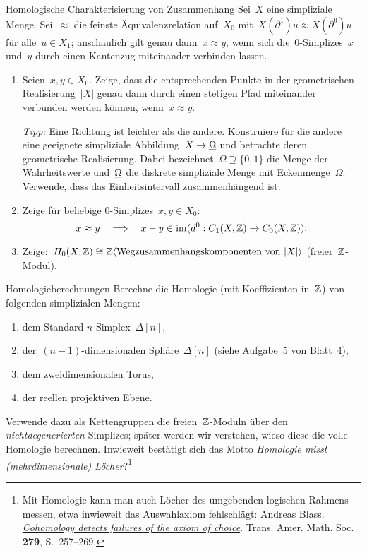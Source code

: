 \documentclass{uebblatt}
\begin{document}

\begin{aufgabe}{Homologische Charakterisierung von Zusammenhang}
Sei~$X$ eine simpliziale Menge. Sei~$\approx$ die feinste Äquivalenzrelation
auf~$X_0$ mit~$X(\partial^1)u \approx X(\partial^0)u$ für alle~$u \in X_1$;
anschaulich gilt genau dann~$x \approx y$, wenn sich die~0-Simplizes~$x$
und~$y$ durch einen Kantenzug miteinander verbinden lassen.
\begin{enumerate}
\item Seien~$x,y \in X_0$. Zeige, dass die entsprechenden Punkte in der
geometrischen Realisierung~$|X|$ genau dann durch einen stetigen Pfad
miteinander verbunden werden können, wenn~$x \approx y$.

{\tiny
\emph{Tipp:} Eine Richtung ist leichter als die andere. Konstruiere für die
andere eine geeignete simpliziale Abbildung~$X \to \underline{\Omega}$ und betrachte
deren geometrische Realisierung. Dabei bezeichnet~$\Omega \supseteq \{0,1\}$ die
Menge der Wahrheitswerte und~$\underline{\Omega}$ die diskrete simpliziale Menge mit
Eckenmenge~$\Omega$. Verwende, dass das Einheitsintervall zusammenhängend ist.\par}

\item Zeige für beliebige 0-Simplizes~$x,y \in X_0$:
\[ x \approx y
  \quad\Longrightarrow\quad
  x - y \in \operatorname{im}(d^0 : C_1(X,\mathbb{Z}) \to C_0(X,\mathbb{Z})). \]

\item Zeige:~$H_0(X,\mathbb{Z}) \cong \mathbb{Z}\langle \text{Wegzusammenhangskomponenten
von~$|X|$} \rangle$ (freier~$\mathbb{Z}$-Modul).
\end{enumerate}
\end{aufgabe}

\begin{aufgabe}{Homologieberechnungen}
Berechne die Homologie (mit Koeffizienten in~$\mathbb{Z}$) von folgenden simplizialen
Mengen:
\begin{enumerate}
\item dem Standard-$n$-Simplex~$\Delta[n]$,
\item der~$(n-1)$-dimensionalen Sphäre~$\dot\Delta[n]$ (siehe Aufgabe~5 von Blatt~4),
\item dem zweidimensionalen Torus,
\item der reellen projektiven Ebene.
\end{enumerate}
Verwende dazu als Kettengruppen die freien~$\mathbb{Z}$-Moduln über den
\emph{nichtdegenerierten} Simplizes; später werden wir verstehen, wieso diese
die volle Homologie berechnen. Inwieweit bestätigt sich das Motto \emph{Homologie misst
(mehrdimensionale) Löcher}?\footnote{Mit Homologie kann man auch Löcher des
umgebenden logischen Rahmens messen, etwa inwieweit das Auswahlaxiom
fehlschlägt: Andreas Blass.
\emph{\href{http://www.ams.org/journals/tran/1983-279-01/S0002-9947-1983-0704615-7/S0002-9947-1983-0704615-7.pdf}{Cohomology detects failures of the axiom of
choice}}. Trans. Amer. Math. Soc. \textbf{279}, S.~257--269.}
\end{aufgabe}
\end{document}
